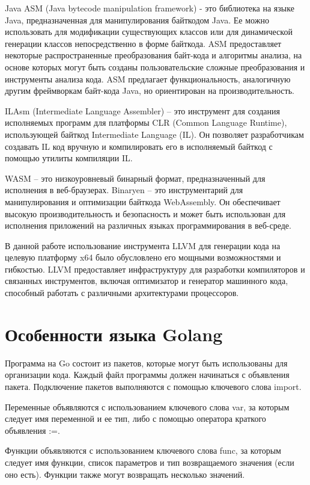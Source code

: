 Java ASM (Java bytecode manipulation framework) - это библиотека на языке Java, предназначенная для манипулирования байткодом Java.
Ее можно использовать для модификации существующих классов или для динамической генерации классов непосредственно в форме байткода.
ASM предоставляет некоторые распространенные преобразования байт-кода и алгоритмы анализа, на основе которых могут быть созданы пользовательские сложные преобразования и инструменты анализа кода.
ASM предлагает функциональность, аналогичную другим фреймворкам байт-кода Java, но ориентирован на производительность.


ILAsm (Intermediate Language Assembler) -- это инструмент для создания исполняемых программ для платформы CLR (Common Language Runtime), использующей байткод Intermediate Language (IL).
Он позволяет разработчикам создавать IL код вручную и компилировать его в исполняемый байткод с помощью утилиты компиляции IL\@.



WASM -- это низкоуровневый бинарный формат, предназначенный для исполнения в веб-браузерах.
Binaryen -- это инструментарий для манипулирования и оптимизации байткода WebAssembly.
Он обеспечивает высокую производительность и безопасность и может быть использован для исполнения приложений на различных языках программирования в веб-среде.



В данной работе использование инструмента LLVM для генерации кода на целевую платформу x64 было обусловлено его мощными возможностями и гибкостью.
LLVM предоставляет инфраструктуру для разработки компиляторов и связанных инструментов, включая оптимизатор и генератор машинного кода, способный работать с различными архитектурами процессоров.

\section{Особенности языка Golang}


Программа на Go состоит из пакетов, которые могут быть использованы для организации кода.
Каждый файл программы должен начинаться с объявления пакета.
Подключение пакетов выполняются с помощью ключевого слова import.

Переменные объявляются с использованием ключевого слова var, за которым следует имя переменной и ее тип, либо с помощью оператора краткого объявления :=.

Функции объявляются с использованием ключевого слова func, за которым следует имя функции, список параметров и тип возвращаемого значения (если оно есть).
Функции также могут возвращать несколько значений.

